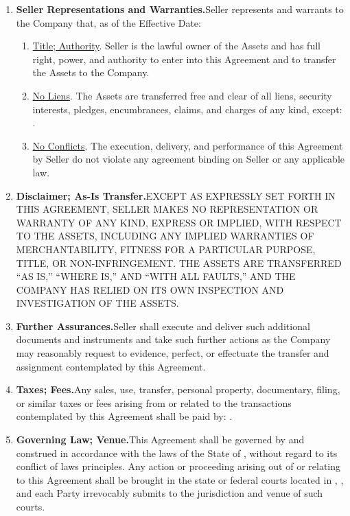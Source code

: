 \begin{enumerate}[leftmargin=*, label=\arabic*.]
	\item \textbf{Seller Representations and Warranties.}\enspace Seller represents and warrants
	to the Company that, as of the Effective Date:
	\begin{enumerate}[leftmargin=*, label=\arabic{enumi}.\arabic*]
		\item \uline{Title; Authority}. Seller is the lawful owner of the Assets and has full
		right, power, and authority to enter into this Agreement and to transfer the Assets to the
		Company.

		\item \uline{No Liens}. The Assets are transferred free and clear of all liens, security
		interests, pledges, encumbrances, claims, and charges of any kind, except: \permittedLiens.

		\item \uline{No Conflicts}. The execution, delivery, and performance of this Agreement by
		Seller do not violate any agreement binding on Seller or any applicable law.
	\end{enumerate}

	\item \textbf{Disclaimer; As-Is Transfer.}\enspace EXCEPT AS EXPRESSLY SET FORTH IN THIS
	AGREEMENT, SELLER MAKES NO REPRESENTATION OR WARRANTY OF ANY KIND, EXPRESS OR IMPLIED, WITH
	RESPECT TO THE ASSETS, INCLUDING ANY IMPLIED WARRANTIES OF MERCHANTABILITY, FITNESS FOR A
	PARTICULAR PURPOSE, TITLE, OR NON-INFRINGEMENT. THE ASSETS ARE TRANSFERRED ``AS IS,'' ``WHERE
	IS,'' AND ``WITH ALL FAULTS,'' AND THE COMPANY HAS RELIED ON ITS OWN INSPECTION AND
	INVESTIGATION OF THE ASSETS.

	\item \textbf{Further Assurances.}\enspace Seller shall execute and deliver such additional
	documents and instruments and take such further actions as the Company may reasonably request
	to evidence, perfect, or effectuate the transfer and assignment contemplated by this
	Agreement.

	\item \textbf{Taxes; Fees.}\enspace Any sales, use, transfer, personal property, documentary,
	filing, or similar taxes or fees arising from or related to the transactions contemplated by
	this Agreement shall be paid by: \taxParty.

	\item \textbf{Governing Law; Venue.}\enspace This Agreement shall be governed by and construed
	in accordance with the laws of the State of \companyState, without regard to its conflict of
	laws principles. Any action or proceeding arising out of or relating to this Agreement shall be
	brought in the state or federal courts located in \venueCounty, \companyState, and each Party
	irrevocably submits to the jurisdiction and venue of such courts.


\end{enumerate}

